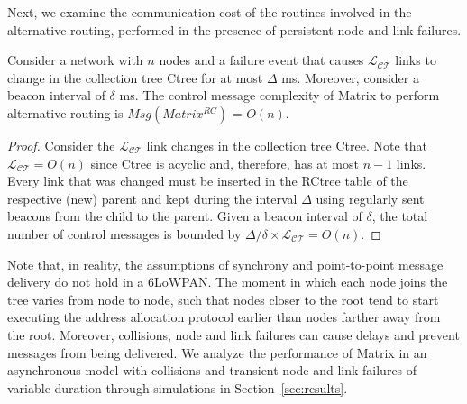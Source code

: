 Next, we examine the communication cost of the routines involved in
the alternative routing, performed in the presence of persistent
node and link failures.


\begin{theorem} Consider a network with $n$ nodes and a failure event that
causes $\mathcal{L_{CT}}$ links to change in the collection tree Ctree for at
most $\Delta$ ms.
Moreover, consider a beacon interval of $\delta$ ms.
The control message complexity of Matrix to perform
alternative routing is $Msg(Matrix^{RC})$ = $O(n)$.
\end{theorem}
\begin{proof}
Consider the $\mathcal{L_{CT}}$ link changes in the collection tree
Ctree. Note that $\mathcal{L_{CT}} = O(n)$ since Ctree is acyclic
and, therefore, has at most $n-1$ links. Every link that was changed
must be inserted in the RCtree table of the respective (new) parent
and kept during the interval $\Delta$ using regularly sent beacons
from the child to the parent. Given a beacon interval of $\delta$,
the total number of control messages is bounded by
${\Delta}/{\delta} \times \mathcal{L_{CT}} = O(n)$.
\end{proof}

Note that, in reality, the assumptions of synchrony and
point-to-point message delivery do not hold in a 6LoWPAN. The moment
in which each node joins the tree varies from node to node, such
that nodes closer to the root tend to start executing the address
allocation protocol earlier than nodes farther away from the root.
Moreover, collisions, node and link failures can cause delays and
prevent messages from being delivered. We analyze the performance of
Matrix in an asynchronous model with collisions and transient node
and link failures of variable duration through simulations in
Section~\ref{sec:results}.
